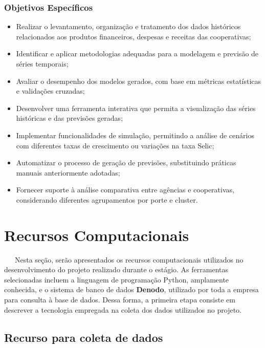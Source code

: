\documentclass[
  12pt,
  a4paper,
]{scrreprt}
\begin{document}
\subsection{Objetivos Específicos}\label{objetivos-especuxedficos}

\begin{itemize}
\item
  Realizar o levantamento, organização e tratamento dos dados históricos
  relacionados aos produtos financeiros, despesas e receitas das
  cooperativas;
\item
  Identificar e aplicar metodologias adequadas para a modelagem e
  previsão de séries temporais;
\item
  Avaliar o desempenho dos modelos gerados, com base em métricas
  estatísticas e validações cruzadas;
\item
  Desenvolver uma ferramenta interativa que permita a visualização das
  séries históricas e das previsões geradas;
\item
  Implementar funcionalidades de simulação, permitindo a análise de
  cenários com diferentes taxas de crescimento ou variações na taxa
  Selic;
\item
  Automatizar o processo de geração de previsões, substituindo práticas
  manuais anteriormente adotadas;
\item
  Fornecer suporte à análise comparativa entre agências e cooperativas,
  considerando diferentes agrupamentos por porte e cluster.
\end{itemize}

\chapter{Recursos Computacionais}\label{recursos-computacionais}

~~~Nesta seção, serão apresentados os recursos computacionais utilizados
no desenvolvimento do projeto realizado durante o estágio. As
ferramentas selecionadas incluem a linguagem de programação Python,
amplamente conhecida, e o sistema de banco de dados \textbf{Denodo},
utilizado por toda a empresa para consulta à base de dados. Dessa forma,
a primeira etapa consiste em descrever a tecnologia empregada na coleta
dos dados utilizados no projeto.

\section{Recurso para coleta de
dados}\label{recurso-para-coleta-de-dados}
\end{document}

